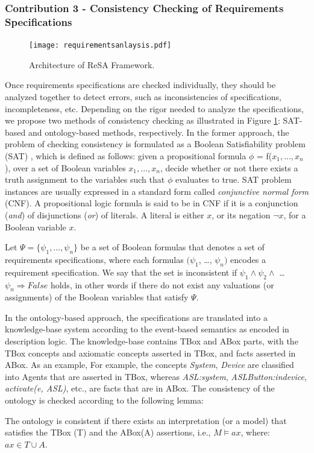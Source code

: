 \subsubsection{Contribution 3 - Consistency Checking of Requirements Specifications}
\begin{figure}
  \centering
  \texttt{[image: requirementsanlaysis.pdf]}
  \caption{Architecture of ReSA Framework.}
  \label{fig_consistencychecking}
\end{figure}
Once requirements specifications are checked individually, they should be analyzed together to detect errors, such as inconsistencies of specifications, incompleteness, etc. Depending on the rigor needed to analyze the specifications, we propose two methods of consistency checking as illustrated in Figure \ref{fig_consistencychecking}: SAT-based and ontology-based methods, respectively. In the former approach, the problem of checking consistency is formulated as a Boolean Satisfiability problem (SAT) \cite{devlin2008satisfiability}, which is defined as follows: given a propositional formula $\phi$ = f($x_1, \ldots, x_n$), over a set of Boolean variables $x_1, \ldots, x_n$, decide whether or not there exists a truth assignment to the variables such that $\phi$ evaluates to {\small\sf true}. SAT problem instances are usually expressed in a standard form called {\em conjunctive normal form} (CNF). A propositional logic formula is said to be in CNF if it is a conjunction ({\em and}) of disjunctions ({\em or}) of literals. A literal is either $x$, or its negation $\lnot x$, for a Boolean variable $x$. %
 \begin{defin} Let $\Psi = \{\psi_1, ..., \psi_n\}$ be a set of Boolean formulas that denotes a set of requirements specifications, where each formulas $(\psi_1$, \ldots, $\psi_n)$ encodes a requirement specification. We say that the set is inconsistent if $\psi_1 \land \psi_2 \land$ \ldots $\psi_n \Rightarrow False$ holds, in other words if there do not exist any valuations (or assignments) of the Boolean variables that satisfy $\Psi$. 
  \end{defin}

In the ontology-based approach, the specifications are translated into a knowledge-base system according to the event-based semantics as encoded in description logic. The knowledge-base contains TBox and ABox parts, with the TBox concepts and axiomatic concepts asserted in TBox, and facts asserted in ABox. As an example, For example, the concepts \textit{System}, \textit{Device} are classified into Agents that are asserted in TBox, whereas\textit{ ASL:system}, \textit{ASLButton:indevice}, \textit{activate(e, ASL)}, etc., are facts that are in ABox. The consistency of the ontology is checked according to the following lemma:
\begin{lemma}
The ontology is consistent if there exists an interpretation (or a model)
that satisfies the TBox (T) and the ABox(A) assertions, i.e., $M \models ax$, where:
$ax\in T\cup A$.
\end{lemma}

